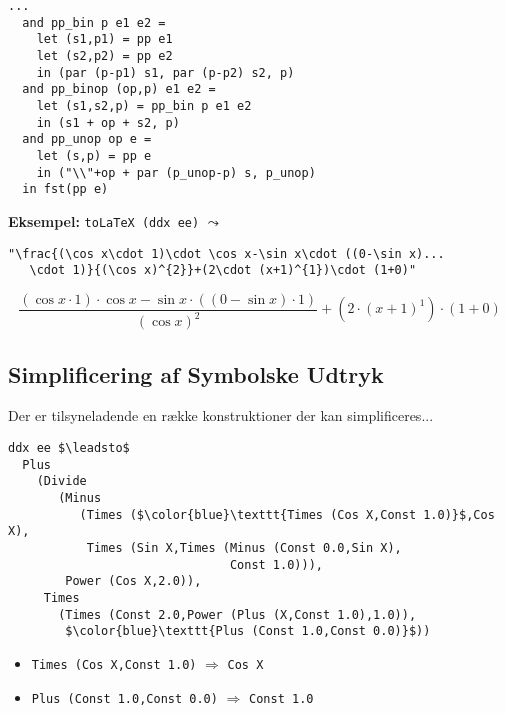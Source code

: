 \documentclass[rgb]{beamer}
\begin{document}
\begin{frame}[fragile]
\begin{footnotesize}


\begin{lstlisting}[numbers=none,frame=none,mathescape]
  ...
  and pp_bin p e1 e2 =
    let (s1,p1) = pp e1
    let (s2,p2) = pp e2
    in (par (p-p1) s1, par (p-p2) s2, p)
  and pp_binop (op,p) e1 e2 =
    let (s1,s2,p) = pp_bin p e1 e2
    in (s1 + op + s2, p)
  and pp_unop op e =
    let (s,p) = pp e
    in ("\\"+op + par (p_unop-p) s, p_unop)
  in fst(pp e)
\end{lstlisting}

\textbf{Eksempel:} \lstinline{toLaTeX (ddx ee)} $\leadsto$
\begin{lstlisting}[numbers=none,frame=none,mathescape]
  "\frac{(\cos x\cdot 1)\cdot \cos x-\sin x\cdot ((0-\sin x)...
   \cdot 1)}{(\cos x)^{2}}+(2\cdot (x+1)^{1})\cdot (1+0)"
\end{lstlisting}

\[
\frac{(\cos x\cdot 1)\cdot \cos x-\sin x\cdot ((0-\sin x)
   \cdot 1)}{(\cos x)^{2}}+(2\cdot (x+1)^{1})\cdot (1+0)
\]

\end{footnotesize}
\end{frame}

\subsection{Simplificering af Symbolske Udtryk}

\begin{frame}[fragile]
\begin{footnotesize}


  \vspace{2ex}

  Der er tilsyneladende en række konstruktioner der kan simplificeres...

\begin{lstlisting}[numbers=none,frame=none,mathescape]
ddx ee $\leadsto$
  Plus
    (Divide
       (Minus
          (Times ($\color{blue}\texttt{Times (Cos X,Const 1.0)}$,Cos X),
           Times (Sin X,Times (Minus (Const 0.0,Sin X),
                               Const 1.0))),
        Power (Cos X,2.0)),
     Times
       (Times (Const 2.0,Power (Plus (X,Const 1.0),1.0)),
        $\color{blue}\texttt{Plus (Const 1.0,Const 0.0)}$))
\end{lstlisting}

\vspace{1ex}
\begin{itemize}
  \item \lstinline{Times (Cos X,Const 1.0)} $\Longrightarrow$ \lstinline{Cos X}
  \item \lstinline{Plus (Const 1.0,Const 0.0)} $\Longrightarrow$ \lstinline{Const 1.0}
\end{itemize}
\end{footnotesize}
\end{frame}
\end{document}
